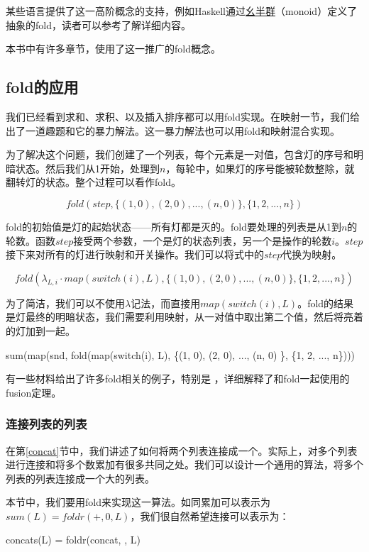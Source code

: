 \documentclass[UTF8]{article}
\begin{document}
某些语言提供了这一高阶概念的支持，例如Haskell通过\underline{幺半群}（monoid）定义了抽象的fold，读者可以参考\cite{learn-haskell}了解详细内容。

本书中有许多章节，使用了这一推广的fold概念。

\subsection{fold的应用}

我们已经看到求和、求积、以及插入排序都可以用fold实现。在映射一节，我们给出了一道趣题和它的暴力解法。这一暴力解法也可以用fold和映射混合实现。

为了解决这个问题，我们创建了一个列表，每个元素是一对值，包含灯的序号和明暗状态。然后我们从1开始，处理到$n$，每轮中，如果灯的序号能被轮数整除，就翻转灯的状态。整个过程可以看作fold。

\[
fold(step, \{(1, 0), (2, 0), ..., (n, 0) \}, \{1, 2, ..., n\})
\]

fold的初始值是灯的起始状态——所有灯都是灭的。fold要处理的列表是从1到$n$的轮数。函数$step$接受两个参数，一个是灯的状态列表，另一个是操作的轮数$i$。$step$接下来对所有的灯进行映射和开关操作。我们可以将式中的$step$代换为映射。

\[
fold(\lambda_{L, i} \cdot map(switch(i), L), \{(1, 0), (2, 0), ..., (n, 0) \}, \{1, 2, ..., n\})
\]

为了简洁，我们可以不使用$\lambda$记法，而直接用$map(switch(i), L)$。fold的结果是灯最终的明暗状态，我们需要利用映射，从一对值中取出第二个值，然后将亮着的灯加到一起。

\be
sum(map(snd, fold(map(switch(i), L), \{(1, 0), (2, 0), ..., (n, 0) \}, \{1, 2, ..., n\})))
\ee

有一些材料给出了许多fold相关的例子，特别是 \cite{fp-pearls}，详细解释了和fold一起使用的fusion定理。

\subsubsection{连接列表的列表}

在第\ref{concat}节中，我们讲述了如何将两个列表连接成一个。实际上，对多个列表进行连接和将多个数累加有很多共同之处。我们可以设计一个通用的算法，将多个列表的列表连接成一个大的列表。

本节中，我们要用fold来实现这一算法。如同累加可以表示为$sum(L) = foldr(+, 0, L)$，我们很自然希望连接可以表示为：

\be
concats(L) = foldr(concat, \phi, L)
\ee
\end{document}
